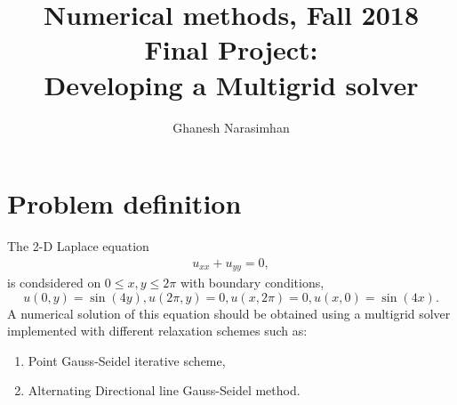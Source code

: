 \documentclass[11pt]{report}
\begin{document}
\title{\textbf{
\textbf{Numerical methods, Fall 2018}\\
Final Project: \\
Developing a Multigrid solver}}
\author{
Ghanesh Narasimhan\\
}
\maketitle
\tableofcontents
%
%


\section{Problem definition}
The 2-D Laplace equation
\begin{align}
u_{xx}+u_{yy}=0, \label{heat_cond}
\end{align}
is condsidered on $0\leq x,y \leq 2\pi$ with boundary conditions,
$$
u(0,y)=\sin(4 y),u(2\pi,y)=0,u(x,2\pi)=0, u(x,0)=\sin(4 x).
$$
A numerical solution of this equation should be 
obtained using a multigrid solver implemented 
with different relaxation schemes such as:
\begin{enumerate}
\item Point Gauss-Seidel iterative scheme,
\item Alternating Directional line Gauss-Seidel method.
\end{enumerate}
\end{document}
